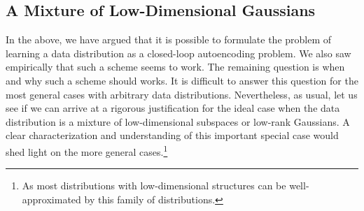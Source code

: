 \documentclass[../../book-main.tex]{subfiles}
\begin{document}

\subsection{A Mixture of Low-Dimensional Gaussians}

In the above, we have argued that it is possible to formulate the problem of learning a data distribution as a closed-loop autoencoding problem. We also saw empirically that such a scheme seems to work. The remaining question is when and why such a scheme should works. It is difficult to answer this question for the most general cases with arbitrary data distributions. Nevertheless, as usual, let us see if we can arrive at a rigorous justification for the ideal case when the data distribution is a mixture of low-dimensional subspaces or low-rank Gaussians. A clear characterization and understanding of this important special case would shed light on the more general cases.\footnote{As most distributions with low-dimensional structures can be well-approximated by this family of distributions.}
\end{document}
